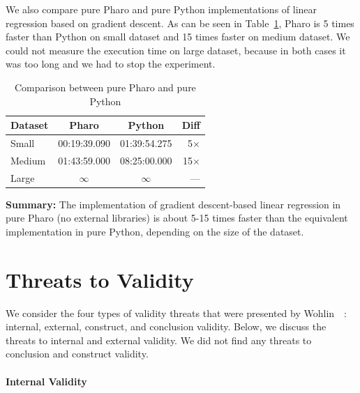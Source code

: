 \documentclass[]{ceurart}
\begin{document}
We also compare pure Pharo and pure Python implementations of linear regression based on gradient descent.
As can be seen in Table~\ref{tab:PharoPython}, Pharo is 5 times faster than Python on small dataset and 15 times faster on medium dataset.
We could not measure the execution time on large dataset, because in both cases it was too long and we had to stop the experiment.

\begin{table}[htbp]
\centering
\caption{Comparison between pure Pharo and pure Python}
\begin{tabular}{l|cc|r}
\hline
\textbf{Dataset} & \textbf{Pharo} & \textbf{Python} & \textbf{Diff} \\
\hline
Small & 00:19:39.090 & 01:39:54.275 & 5$\times$ \\
Medium & 01:43:59.000 & 08:25:00.000 & 15$\times$ \\
Large & $\infty$ & $\infty$ & --- \\
\hline
\end{tabular}
\label{tab:PharoPython}
\end{table}

\begin{cbox}
\textbf{Summary:} The implementation of gradient descent-based linear regression in pure Pharo (no external libraries) is about 5-15 times faster than the equivalent implementation in pure Python, depending on the size of the dataset.
\end{cbox}


\section{Threats to Validity}
\label{sec:Threats}

We consider the four types of validity threats that were presented by Wohlin~\etal~\cite{Wohl00a}: internal, external, construct, and conclusion validity.
Below, we discuss the threats to internal and external validity.
We did not find any threats to conclusion and construct validity.

\paragraph{Internal Validity}
\end{document}

